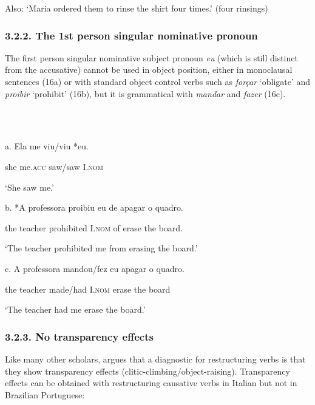 \documentclass[output=paper]{langsci/langscibook}
\begin{document}
 Also: ‘Maria ordered them to rinse the shirt four times.’ (four rinsings)

\subsubsection{ 3.2.2. The 1st person singular nominative pronoun}

The first person singular nominative subject pronoun \textit{eu} (which is still distinct from the accusative) cannot be used in object position, either in monoclausal sentences (16a) or with standard object control verbs such as \textit{forçar} ‘obligate’ and \textit{proibir} ‘prohibit’ (16b), but it is grammatical with \textit{mandar} and \textit{fazer} (16c). 

\ea%
    \label{ex:key:16}
    \gll\\
        \\
    \glt
    \z

          a.  Ela  me     viu/viu  *eu.

             she   me.\textsc{acc} saw/saw     I.\textsc{nom}

    ‘She saw me.’

  b.  *A professora proibiu   eu        de apagar o quadro.

    the teacher     prohibited   I.\textsc{nom}  of erase    the board. 

    ‘The teacher prohibited me from erasing the board.’

  c.  A professora mandou/fez  eu        apagar o quadro.

    the teacher    made/had      I.\textsc{nom} erase    the board

    ‘The teacher had me erase the board.’ \citep[121]{Farrell1995}

\subsubsection{ 3.2.3. No transparency effects}

Like many other scholars, \citet{Cinque2004} argues that a diagnostic for restructuring verbs is that they show transparency effects (clitic-climbing/object-raising). Transparency effects can be obtained with restructuring causative verbs in Italian but not in Brazilian Portuguese:

\ea%
    \label{ex:key:17}
    \gll\\
        \\
    \glt
    \z
\end{document}
